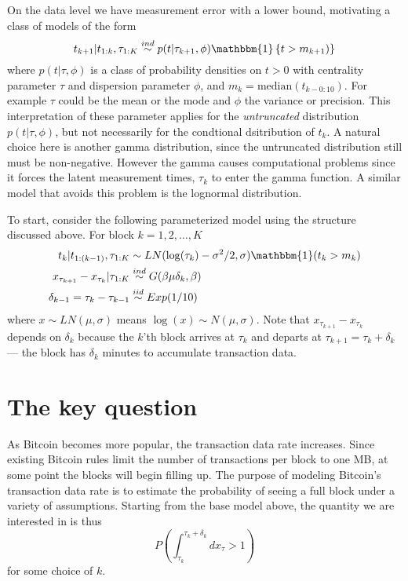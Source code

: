 \documentclass{article}
\begin{document}
On the data level we have measurement error with a lower bound, motivating a class of models of the form 
\[
t_{k+1} |t_{1:k}, \tau_{1:K} \stackrel{ind}{\sim} p(t|\tau_{k+1}, \phi)\mathbbm{1}\left\{t > m_{k+1})\right\}
\]
where $p(t|\tau,\phi)$ is a class of probability densities on $t>0$ with centrality parameter $\tau$ and dispersion parameter $\phi$, and $m_k = \mathrm{median}(t_{k - 0:10})$. For example $\tau$ could be the mean or the mode and $\phi$ the variance or precision. This interpretation of these parameter applies for the {\it untruncated} distribution $p(t|\tau,\phi)$, but not necessarily for the condtional dsitribution of $t_k$. A natural choice here is another gamma distribution, since the untruncated distribution still must be non-negative. However the gamma causes computational problems since it forces the latent measurement times, $\tau_k$ to enter the gamma function. A similar model that avoids this problem is the lognormal distribution.

To start, consider the following parameterized model using the structure discussed above. For block $k=1,2,\dots,K$
\begin{align*}
t_k|t_{1:(k-1)}, \tau_{1:K} &\sim LN(\log(\tau_k) - \sigma^2/2, \sigma)\mathbbm{1}(t_k > m_k)\\
x_{\tau_{k+1}} - x_{\tau_{k}}|\tau_{1:K} & \stackrel{ind}{\sim} G(\beta\mu\delta_k,\beta)\\
\delta_{k-1} = \tau_k - \tau_{k-1} &\stackrel{iid}{\sim} Exp(1/10)
\end{align*}
where $x\sim LN(\mu,\sigma)$ means $\log(x) \sim N(\mu,\sigma)$. Note that $x_{\tau_{k+1}} - x_{\tau_k}$ depends on $\delta_k$ because the $k$'th block arrives at $\tau_k$ and departs at $\tau_{k+1}=\tau_k + \delta_k$ --- the block has $\delta_k$ minutes to accumulate transaction data.


\section{The key question}
As Bitcoin becomes more popular, the transaction data rate increases. Since existing Bitcoin rules limit the number of transactions per block to one MB, at some point the blocks will begin filling up. The purpose of modeling Bitcoin's transaction data rate is to estimate the probability of seeing a full block under a variety of assumptions. Starting from the base model above, the quantity we are interested in is thus
\[
P\left(\int_{\tau_k}^{\tau_{k}+\delta_k}dx_\tau > 1\right)
\]
for some choice of $k$. 
\end{document}
